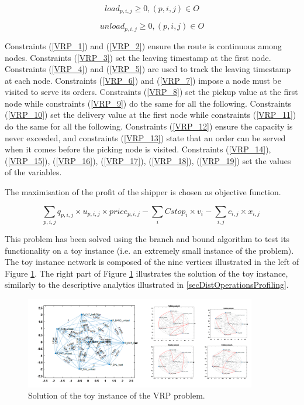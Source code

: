 \begin{equation}
{load}_{p,i,j}\geq0, (p,i,j)\in O
\label{VRP_18}
\end{equation}

\begin{equation}
{unload}_{p,i,j}\geq0, (p,i,j)\in O
\label{VRP_19}
\end{equation}

Constraints (\ref{VRP_1}) and (\ref{VRP_2}) ensure the route is continuous among nodes. Constraints (\ref{VRP_3}) set the leaving timestamp at the first node. Constraints (\ref{VRP_4}) and (\ref{VRP_5}) are used to track the leaving timestamp at each node. Constraints (\ref{VRP_6}) and (\ref{VRP_7}) impose a node must be visited to serve its orders. Constraints (\ref{VRP_8}) set the pickup value at the first node while constraints (\ref{VRP_9}) do the same for all the following. Constraints (\ref{VRP_10}) set the delivery value at the first node while constraints (\ref{VRP_11}) do the same for all the following. Constraints (\ref{VRP_12}) ensure the capacity is never exceeded, and constraints (\ref{VRP_13}) state that an order can be served when it comes before the picking node is visited. Constraints (\ref{VRP_14}), (\ref{VRP_15}), (\ref{VRP_16}), (\ref{VRP_17}), (\ref{VRP_18}), (\ref{VRP_19}) set the values of the variables.\par

The maximisation of the profit of the shipper is chosen as objective function.

\begin{equation}
\sum_{p,i,j}{q_{p,i,j}\times u_{p,i,j}\times p r i c e_{p,i,j}-\sum_{i}{Cstop_i\times v_i}-\sum_{i,j}{c_{i,j}\times x_{i,j}\ }}
\end{equation}

This problem has been solved using the branch and bound algorithm to test its functionality on a toy instance (i.e. an extremely small instance of the problem). The toy instance network is composed of the nine vertices illustrated in the left of Figure \ref{fig_vesselsOptimal}. The right part of Figure \ref{fig_vesselsOptimal} illustrates the solution of the toy instance, similarly to the descriptive analytics illustrated in \ref{secDistOperationsProfiling}.

\begin{figure}[hbt!]
\centering
\includegraphics[width=0.9\textwidth]{SectionDistribution/control_figures/fig_vesselsOptimal.png}
\captionsetup{type=figure}
\caption{Solution of the toy instance of the VRP problem.}
\label{fig_vesselsOptimal}
\end{figure}

